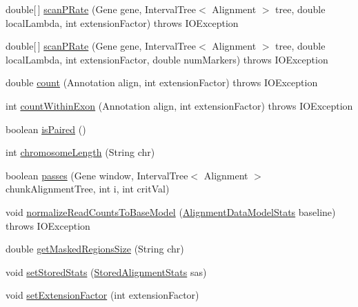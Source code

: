 \begin{DoxyCompactItemize}
\item 
double\mbox{[}$\,$\mbox{]} \hyperlink{classbroad_1_1pda_1_1seq_1_1segmentation_1_1_alignment_data_model_stats_ae7c6f90b502f38173c5dad2d62c6222f}{scan\+P\+Rate} (Gene gene, Interval\+Tree$<$ Alignment $>$ tree, double local\+Lambda, int extension\+Factor)  throws I\+O\+Exception 
\item 
double\mbox{[}$\,$\mbox{]} \hyperlink{classbroad_1_1pda_1_1seq_1_1segmentation_1_1_alignment_data_model_stats_a465cfc5c5e4054d5f00bcf5089e604fe}{scan\+P\+Rate} (Gene gene, Interval\+Tree$<$ Alignment $>$ tree, double local\+Lambda, int extension\+Factor, double num\+Markers)  throws I\+O\+Exception 
\item 
double \hyperlink{classbroad_1_1pda_1_1seq_1_1segmentation_1_1_alignment_data_model_stats_a583c93381358136c1c916e4bcf195bcc}{count} (Annotation align, int extension\+Factor)  throws I\+O\+Exception 
\item 
int \hyperlink{classbroad_1_1pda_1_1seq_1_1segmentation_1_1_alignment_data_model_stats_a87bfcd3cfd5d4adaad76fd1b87ddc937}{count\+Within\+Exon} (Annotation align, int extension\+Factor)  throws I\+O\+Exception 
\item 
boolean \hyperlink{classbroad_1_1pda_1_1seq_1_1segmentation_1_1_alignment_data_model_stats_a407275e05e013a63813920aa391e24bb}{is\+Paired} ()
\item 
int \hyperlink{classbroad_1_1pda_1_1seq_1_1segmentation_1_1_alignment_data_model_stats_a050728258c8438e309c1412caabcc130}{chromosome\+Length} (String chr)
\item 
boolean \hyperlink{classbroad_1_1pda_1_1seq_1_1segmentation_1_1_alignment_data_model_stats_a8cf71cc29c5ee49d838efbd258e8353b}{passes} (Gene window, Interval\+Tree$<$ Alignment $>$ chunk\+Alignment\+Tree, int i, int crit\+Val)
\item 
void \hyperlink{classbroad_1_1pda_1_1seq_1_1segmentation_1_1_alignment_data_model_stats_a595aff33346931dc14c8b35a2e247692}{normalize\+Read\+Counts\+To\+Base\+Model} (\hyperlink{classbroad_1_1pda_1_1seq_1_1segmentation_1_1_alignment_data_model_stats}{Alignment\+Data\+Model\+Stats} baseline)  throws I\+O\+Exception 
\item 
double \hyperlink{classbroad_1_1pda_1_1seq_1_1segmentation_1_1_alignment_data_model_stats_aac01d478cd4d5a31d5d9a51b86cb9d2a}{get\+Masked\+Regions\+Size} (String chr)
\item 
void \hyperlink{classbroad_1_1pda_1_1seq_1_1segmentation_1_1_alignment_data_model_stats_a3634e42ab60abcfed989990ea8956415}{set\+Stored\+Stats} (\hyperlink{classbroad_1_1pda_1_1seq_1_1alignment_1_1_stored_alignment_stats}{Stored\+Alignment\+Stats} sas)
\item 
void \hyperlink{classbroad_1_1pda_1_1seq_1_1segmentation_1_1_alignment_data_model_stats_ad3f655755e12f50f3511c176c678c338}{set\+Extension\+Factor} (int extension\+Factor)
\end{DoxyCompactItemize}


